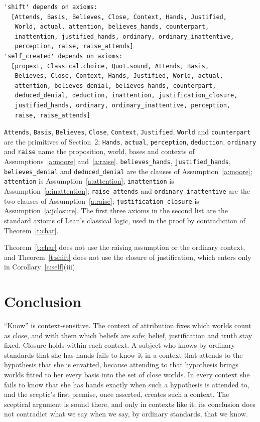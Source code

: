 \documentclass{situationist-preprint}
\begin{document}
\begin{lstlisting}
'shift' depends on axioms:
  [Attends, Basis, Believes, Close, Context, Hands, Justified,
   World, actual, attention, believes_hands, counterpart,
   inattention, justified_hands, ordinary, ordinary_inattentive,
   perception, raise, raise_attends]
'self_created' depends on axioms:
  [propext, Classical.choice, Quot.sound, Attends, Basis,
   Believes, Close, Context, Hands, Justified, World, actual,
   attention, believes_denial, believes_hands, counterpart,
   deduced_denial, deduction, inattention, justification_closure,
   justified_hands, ordinary, ordinary_inattentive, perception,
   raise, raise_attends]
\end{lstlisting}

\begin{sloppypar}
\texttt{Attends}, \texttt{Basis}, \texttt{Believes}, \texttt{Close}, \texttt{Context}, \texttt{Justified}, \texttt{World} and \texttt{counterpart} are the primitives of Section~2; \texttt{Hands}, \texttt{actual}, \texttt{perception}, \texttt{deduction}, \texttt{ordinary} and \texttt{raise} name the proposition, world, bases and contexts of Assumptions~\ref{a:moore} and~\ref{a:raise}. \texttt{believes\_hands}, \texttt{justified\_hands}, \texttt{believes\_denial} and \texttt{deduced\_denial} are the clauses of Assumption~\ref{a:moore}; \texttt{attention} is Assumption~\ref{a:attention}; \texttt{inattention} is Assumption~\ref{a:inattention}; \texttt{raise\_attends} and \texttt{ordinary\_inattentive} are the two clauses of Assumption~\ref{a:raise}; \texttt{justification\_closure} is Assumption~\ref{a:jclosure}. The first three axioms in the second list are the standard axioms of Lean's classical logic, used in the proof by contradiction of Theorem~\ref{t:char}.
\end{sloppypar}

Theorem~\ref{t:char} does not use the raising assumption or the ordinary context, and Theorem~\ref{t:shift} does not use the closure of justification, which enters only in Corollary~\ref{c:self}(iii).

\section{Conclusion}

\enquote{Know} is context-sensitive. The context of attribution fixes which worlds count as close, and with them which beliefs are safe; belief, justification and truth stay fixed. Closure holds within each context. A subject who knows by ordinary standards that she has hands fails to know it in a context that attends to the hypothesis that she is envatted, because attending to that hypothesis brings worlds fitted to her every basis into the set of close worlds. In every context she fails to know that she has hands exactly when such a hypothesis is attended to, and the sceptic's first premise, once asserted, creates such a context. The sceptical argument is sound there, and only in contexts like it; its conclusion does not contradict what we say when we say, by ordinary standards, that we know.
\end{document}
